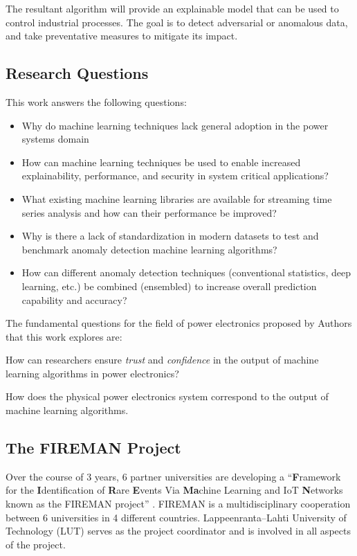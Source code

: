 The resultant algorithm will provide an explainable model that can be used to control industrial processes. The goal is to detect adversarial or anomalous data, and take preventative measures to mitigate its impact.


\subsection{Research Questions}
This work answers the following questions:
\begin{itemize}
    \item Why do machine learning techniques lack general adoption in the power systems domain
    \item How can machine learning techniques be used to enable increased explainability, performance, and security in system critical applications?
    \item What existing machine learning libraries are available for streaming time series analysis and how can their performance be improved?
    \item Why is there a lack of standardization in modern datasets to test and benchmark anomaly detection machine learning algorithms?
    \item How can different anomaly detection techniques (conventional statistics, deep learning, etc.) be combined (ensembled) to increase overall prediction capability and accuracy?
\end{itemize}

The fundamental questions for the field of power electronics proposed by Authors \cite{black-box-explainability} that this work explores are:
\begin{inlinelist}
    \item How can researchers ensure \textit{trust} and \textit{confidence} in the output of machine learning algorithms in power electronics?
    \item How does the physical power electronics system correspond to the output of machine learning algorithms.
\end{inlinelist}


\subsection{The FIREMAN Project}

Over the course of 3 years, 6 partner universities are developing a \enquote{\textbf{F}ramework for the \textbf{I}dentification of \textbf{R}are \textbf{E}vents Via \textbf{Ma}chine Learning and IoT \textbf{N}etworks known as the FIREMAN project} \parencite{fireman-homepage}. FIREMAN is a multidisciplinary cooperation between 6 universities in 4 different countries. Lappeenranta--Lahti University of Technology (LUT) serves as the project coordinator and is involved in all aspects of the project.

